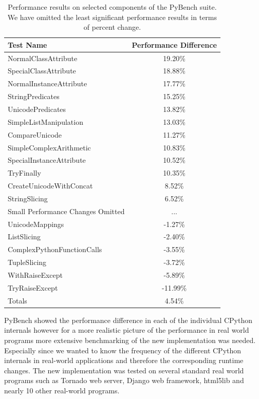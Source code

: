 \documentclass[11pt]{article}
\begin{document}
\begin{table}
  \caption{Performance results on selected components of the PyBench suite.  We
    have omitted the least significant performance results in terms of percent
    change.
  }
\begin{tabular}{| l | c |}
  \hline
  \textbf{Test Name} & \textbf{Performance Difference} \\ \hline
  NormalClassAttribute &  19.20\% \\ \hline
  SpecialClassAttribute &  18.88\% \\ \hline
  NormalInstanceAttribute &  17.77\% \\ \hline
  StringPredicates &  15.25\% \\ \hline
  UnicodePredicates &  13.82\% \\ \hline
  SimpleListManipulation &  13.03\% \\ \hline
  CompareUnicode &  11.27\% \\ \hline
  SimpleComplexArithmetic &  10.83\% \\ \hline
  SpecialInstanceAttribute &  10.52\% \\ \hline
  TryFinally &  10.35\% \\ \hline
  CreateUnicodeWithConcat &  8.52\% \\ \hline
  StringSlicing &  6.52\% \\ \hline
  Small Performance Changes Omitted & ... \\ \hline
  UnicodeMappings &  -1.27\% \\ \hline
  ListSlicing &  -2.40\% \\ \hline
  ComplexPythonFunctionCalls &  -3.55\% \\ \hline
  TupleSlicing &  -3.72\% \\ \hline
  WithRaiseExcept &  -5.89\% \\ \hline
  TryRaiseExcept &  -11.99\% \\ \hline
  Totals & 4.54\% \\ \hline
\end{tabular}
\end{table}

PyBench showed the performance difference in each of the individual CPython internals however for a more realistic picture of the performance in real world programs more extensive benchmarking of the new implementation was needed. Especially since we wanted to know the frequency of the different CPython internals in real-world applications and therefore the corresponding runtime changes. The new implementation was tested on several standard real world programs such as Tornado web server, Django web framework, html5lib and nearly 10 other real-world programs. 
\end{document}
